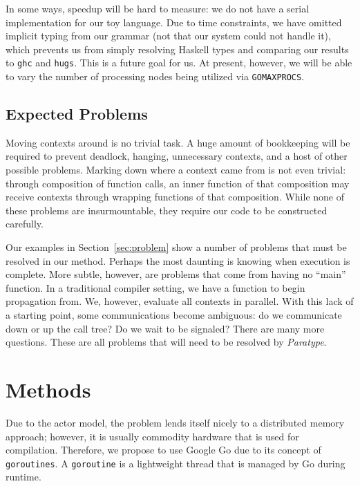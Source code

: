 \documentclass{acm_proc_article-sp}
\begin{document}
In some ways, speedup will be hard to measure: we do not have a serial
implementation for our toy language. Due to time constraints, we
have omitted implicit typing from our grammar (not that our system
could not handle it), which prevents us from simply resolving Haskell
types and comparing our results to \texttt{ghc} and
\texttt{hugs}. This is a future goal for us. At present, however,
we will be able to vary the number of processing nodes being
utilized via \texttt{GOMAXPROCS}.

\subsection{Expected Problems}

Moving contexts around is no trivial task. A huge amount of
bookkeeping will be required to prevent deadlock, hanging, unnecessary
contexts, and a host of other possible problems. Marking down where a
context came from is not even trivial: through composition of
function calls, an inner function of that composition may receive
contexts through wrapping functions of that composition. While none of
these problems are insurmountable, they require our code to be
constructed carefully.

Our examples in Section~\ref{sec:problem} show a number of problems that must be
resolved in our method. Perhaps the most daunting is knowing when
execution is complete. More subtle, however, are problems that
come from having no ``main'' function. In a traditional compiler
setting, we have a function to begin propagation from. We, however,
evaluate all contexts in parallel. With this lack of a starting point,
some communications become ambiguous: do we communicate down or up
the call tree? Do we wait to be signaled? There are many more questions. These
are all problems that will need to be resolved by \emph{Paratype}.

\section{Methods}


Due to the actor model, the problem lends itself nicely to a distributed memory
approach; however, it is usually commodity hardware that is used for
compilation. Therefore, we propose to use Google Go due to its concept of
\texttt{goroutines}. A \texttt{goroutine} is a lightweight thread that is
managed by Go during runtime.
\end{document}
